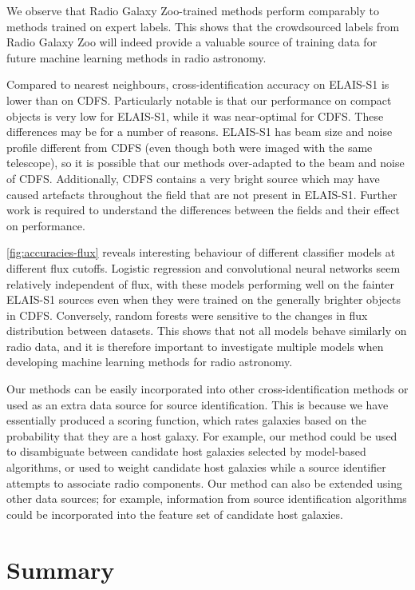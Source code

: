 \documentclass[fleqn,usenatbib,usedcolumn]{mnras}
\begin{document}
  We observe that Radio Galaxy Zoo-trained methods perform comparably to
  methods trained on expert labels. This shows that the crowdsourced labels
  from Radio Galaxy Zoo will indeed provide a valuable source of training
  data for future machine learning methods in radio astronomy.

  Compared to nearest neighbours, cross-identification accuracy on ELAIS-S1 is lower than on CDFS. Particularly notable is that our performance on compact objects is very low for ELAIS-S1, while it was near-optimal for CDFS. These differences may be for a number of reasons. ELAIS-S1 has beam size and noise profile different from CDFS (even though both were imaged with the same telescope), so it is possible that our methods over-adapted to the beam and noise of CDFS. Additionally, CDFS contains a very bright source which may have caused artefacts throughout the field that are not present in ELAIS-S1. Further work is required to understand the differences between the fields and their effect on performance.

  \autoref{fig:accuracies-flux} reveals interesting behaviour of different
  classifier models at different flux cutoffs. Logistic regression and
  convolutional neural networks seem relatively independent of flux, with
  these models performing well on the fainter ELAIS-S1 sources even when
  they were trained on the generally brighter objects in CDFS. Conversely,
  random forests were sensitive to the changes in flux distribution between
  datasets. This shows that not all models behave similarly on radio data,
  and it is therefore important to investigate multiple models when
  developing machine learning methods for radio astronomy.

  Our methods can be easily incorporated into other cross-identification
  methods or used as an extra data source for source identification. This is
  because we have essentially produced a scoring function, which rates
  galaxies based on the probability that they are a host galaxy. For
  example, our method could be used to disambiguate between candidate host
  galaxies selected by model-based algorithms, or used to weight candidate
  host galaxies while a source identifier attempts to associate radio
  components. Our method can also be extended using other data sources; for
  example, information from source identification algorithms could be
  incorporated into the feature set of candidate host galaxies.

\section{Summary}
\end{document}
